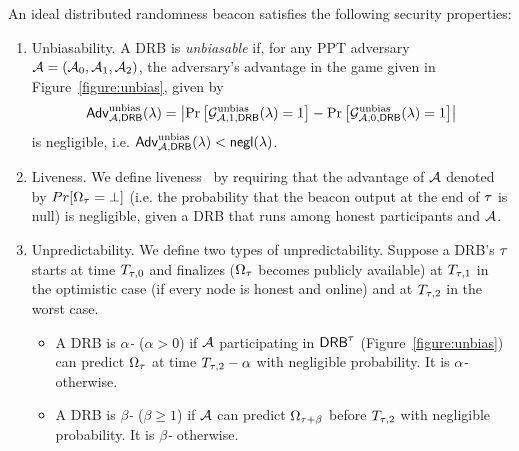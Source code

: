 \begin{definition}
An ideal distributed randomness beacon satisfies the following security properties:
\begin{enumerate}
\item Unbiasability.
A DRB is \textit{unbiasable} if, for any PPT adversary $\mathcal{A} = (\mathcal{A}_0, \mathcal{A}_1, \mathcal{A}_2)$, the adversary's advantage in the game given in Figure~\ref{figure:unbias}, given by
\begingroup\makeatletter\def\f@size{8}\check@mathfonts
\begin{equation*}
\mathsf{Adv}^\text{unbias}_{\mathcal{A}, \mathsf{DRB}}(\lambda) = \left|\Pr\left[\mathcal{G}^\text{unbias}_{\mathcal{A}, 1, \mathsf{DRB}}(\lambda) = 1\right] - \Pr\left[\mathcal{G}^\text{unbias}_{\mathcal{A}, 0, \mathsf{DRB}}(\lambda) = 1\right]\right|
\end{equation*}\endgroup
is negligible, i.e. $\mathsf{Adv}^\text{unbias}_{\mathcal{A}, \mathsf{DRB}}(\lambda) < \mathsf{negl}(\lambda)$.

\item Liveness. We define liveness~\cite{guo2020secRand} by requiring that the advantage of $\mathcal{A}$ denoted by $Pr[\Omega_\tau = \text{$\perp$}]$ (i.e. the probability that the beacon output at the end of \epoch $\tau$ is null) is negligible, given a DRB that runs among honest participants and $\mathcal{A}$.

\item Unpredictability.
We define two types of unpredictability.
Suppose a DRB's \epoch $\tau$ starts at time $T_{\tau, 0}$ and finalizes ($\Omega_\tau$ becomes publicly available) at $T_{\tau, 1}$ in the optimistic case (if every node is honest and online) and at $T_{\tau, 2}$ in the worst case.
\begin{itemize}
\item A DRB is \textit{$\alpha$-\intraunpredictable} ($\alpha > 0$) if $\mathcal{A}$ participating in $\mathsf{DRB}^\tau$ (Figure~\ref{figure:unbias}) can predict $\Omega_\tau$ at time $T_{\tau, 2} - \alpha$ with negligible probability.
It is \textit{$\alpha$-\intrapredictable} otherwise.
\item A DRB is \textit{$\beta$-\interunpredictable} ($\beta \geq 1$) if $\mathcal{A}$ can predict $\Omega_{\tau + \beta}$ before $T_{\tau, 2}$ with negligible probability.
It is \textit{$\beta$-\interpredictable} otherwise.
\end{itemize}
\end{enumerate}
\end{definition}

